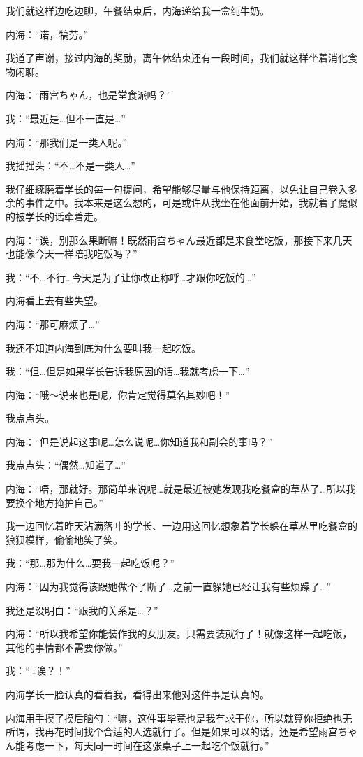 我们就这样边吃边聊，午餐结束后，内海递给我一盒纯牛奶。

内海：“诺，犒劳。”

我道了声谢，接过内海的奖励，离午休结束还有一段时间，我们就这样坐着消化食物闲聊。

内海：“雨宫ちゃん，也是堂食派吗？”

我：“最近是…但不一直是…”

内海：“那我们是一类人呢。”

我摇摇头：“不…不是一类人…”

我仔细琢磨着学长的每一句提问，希望能够尽量与他保持距离，以免让自己卷入多余的事件之中。我本来是这么想的，可是或许从我坐在他面前开始，我就着了魔似的被学长的话牵着走。

内海：“诶，别那么果断嘛！既然雨宫ちゃん最近都是来食堂吃饭，那接下来几天也能像今天一样陪我吃饭吗？”

我：“不…不行…今天是为了让你改正称呼…才跟你吃饭的…”

内海看上去有些失望。

内海：“那可麻烦了…”

我还不知道内海到底为什么要叫我一起吃饭。

我：“但…但是如果学长告诉我原因的话…我就考虑一下…”

内海：“哦～说来也是呢，你肯定觉得莫名其妙吧！”

我点点头。

内海：“但是说起这事呢…怎么说呢…你知道我和副会的事吗？”

我点点头：“偶然…知道了…”

内海：“唔，那就好。那简单来说呢…就是最近被她发现我吃餐盒的草丛了…所以我要换个地方掩护自己。”

我一边回忆着昨天沾满落叶的学长、一边用这回忆想象着学长躲在草丛里吃餐盒的狼狈模样，偷偷地笑了笑。

我：“那…那为什么…要我一起吃饭呢？”

内海：“因为我觉得该跟她做个了断了…之前一直躲她已经让我有些烦躁了…”

我还是没明白：“跟我的关系是…？”

内海：“所以我希望你能装作我的女朋友。只需要装就行了！就像这样一起吃饭，其他的事情都不需要你做。”

我：“…诶？！”

内海学长一脸认真的看着我，看得出来他对这件事是认真的。

内海用手摸了摸后脑勺：“嘛，这件事毕竟也是我有求于你，所以就算你拒绝也无所谓，我再花时间找个合适的人选就行了。但是如果可以的话，还是希望雨宫ちゃん能考虑一下，每天同一时间在这张桌子上一起吃个饭就行。”

